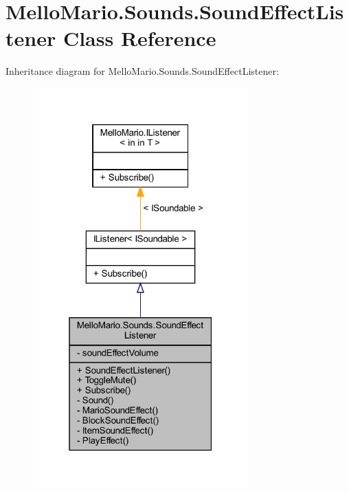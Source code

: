 \section{Mello\+Mario.\+Sounds.\+Sound\+Effect\+Listener Class Reference}
\label{classMelloMario_1_1Sounds_1_1SoundEffectListener}


Inheritance diagram for Mello\+Mario.\+Sounds.\+Sound\+Effect\+Listener\+:
\nopagebreak
\begin{figure}[H]
\begin{center}
\leavevmode
\includegraphics[width=235pt]{classMelloMario_1_1Sounds_1_1SoundEffectListener__inherit__graph}
\end{center}
\end{figure}


